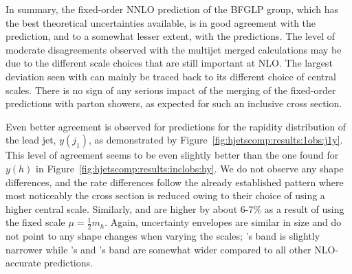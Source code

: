 In summary, the fixed-order NNLO prediction of the BFGLP group, which
has the best theoretical uncertainties available, is in good agreement
with the \hjetscompSherpa \hjetscompNNLOPS prediction, and to a
somewhat lesser extent, with the \hjetscompPowheg \hjetscompNNLOPS predictions. The level of
moderate disagreements observed with the multijet merged calculations 
may be due to the different scale choices that are still important 
at NLO. The largest deviation seen with \hjetscompMGaMC can mainly be traced
back to its different choice of central scales. There is no sign of
any serious impact of the merging of the fixed-order predictions with
parton showers, as expected for such an inclusive cross section.

Even better agreement is observed  for predictions for the rapidity distribution of the lead jet,
$y(j_1)$, as demonstrated by Figure~\ref{fig:hjetscomp:results:1obs:j1y}.
This level of agreement seems to be even slightly better than the one
found for $y(h)$ in Figure~\ref{fig:hjetscomp:results:inclobs:hy}.
We do not observe any shape differences, and the rate differences 
follow the already established pattern where most noticeably the
\hjetscompMGaMC cross section is reduced owing to their choice of using a
higher central scale. Similarly, \hjetscompSherpa \hjetscompNNLOPS and \hjetscompResbos are
higher by about 6-7\% as a result of using the fixed scale
$\mu=\tfrac{1}{2}m_h$. Again, uncertainty envelopes are similar in
size and do not point to any shape changes when varying the scales;
\hjetscompHerwig's band is slightly narrower while \hjetscompSherpa \hjetscompMEPSatNLO's and
\hjetscompMGaMC's band are somewhat wider compared to all other NLO-accurate
predictions.

